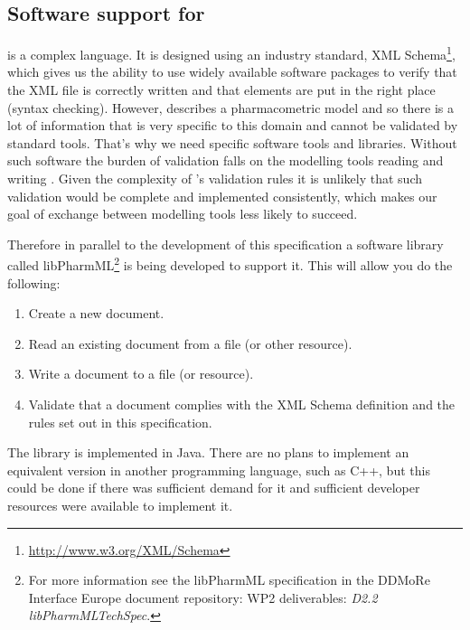 \subsection{Software support for \pharmml}
\label{sec:libpharmml}

\pharmml is a complex language. It is designed using an industry
standard, XML Schema\footnote{\url{http://www.w3.org/XML/Schema}}, which gives us the
ability to use widely available software packages to verify that the
XML file is correctly written and that elements are put in the right
place (syntax checking). However, \pharmml describes a pharmacometric
model and so there is a lot of information that is very specific to
this domain and cannot be validated by standard tools.  That's why we need
\pharmml specific software tools and libraries. Without such software
the burden of validation falls on the modelling tools reading and
writing \pharmml. Given the complexity of \pharmml's validation rules
it is unlikely that such validation would be complete and implemented
consistently, which makes our goal of exchange between modelling
tools less likely to succeed.

Therefore in parallel to the development of this specification a
software library called libPharmML\footnote{For more information see
  the libPharmML specification in the DDMoRe Interface Europe
  document repository: WP2 deliverables: \emph{D2.2
    libPharmMLTechSpec}.} is being developed to support it.  This will
allow you do the following:
%
\begin{enumerate}
\item Create a new \pharmml document.
\item Read an existing \pharmml document from a file (or other
  resource).
\item Write a \pharmml document to a file (or resource).
\item Validate that a \pharmml document complies with the XML Schema
  definition and the rules set out in this specification.
\end{enumerate}
%
The library is implemented in Java. There are no plans to implement an equivalent
version in another programming language, such as C++, but this could be done if
there was sufficient demand for it and sufficient developer resources were available
to implement it.
